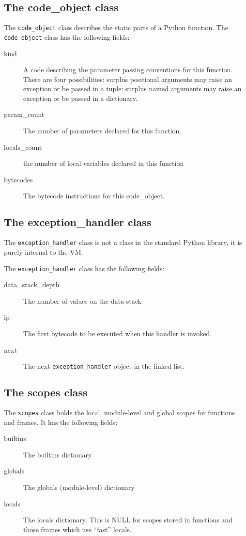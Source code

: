\documentclass[a4paper,10pt]{article}
\begin{document}
\subsection{The code\_object class}

The \verb|code_object| class describes the static parts of a Python function. The  \verb|code_object| class has the following fields:
\begin{description}
\item[kind] A code describing the parameter passing conventions for this function. There are four possibilities: surplus positional arguments may raise an exception or be passed in a tuple; surplus named arguments may raise an exception or be passed in a dictionary.
\item[param\_count] The number of parameters declared for this function.
\item[locals\_count] the number of local variables declared in this function
\item[bytecodes] The bytecode instructions for this code\_object.
\end{description}

\subsection{The exception\_handler class}
The \verb|exception_handler| class is not a class in the standard Python library, it is purely internal to the VM.

The \verb|exception_handler| class has the following fields:
\begin{description}
\item[data\_stack\_depth] The number of values on the data stack
\item[ip] The first bytecode to be executed when this handler is invoked.
\item[next] The next \verb|exception_handler| object in the linked list.
\end{description}

\subsection{The scopes class}
The \verb|scopes|  class holds the local, module-level and global scopes for functions and frames.
It has the following fields:
\begin{description}
\item[builtins] The builtins dictionary
\item[globals] The globals (module-level) dictionary
\item[locals] The locals dictionary. This is NULL for scopes stored in functions and those frames which use ``fast'' locals.
\end{description}
\end{document}
